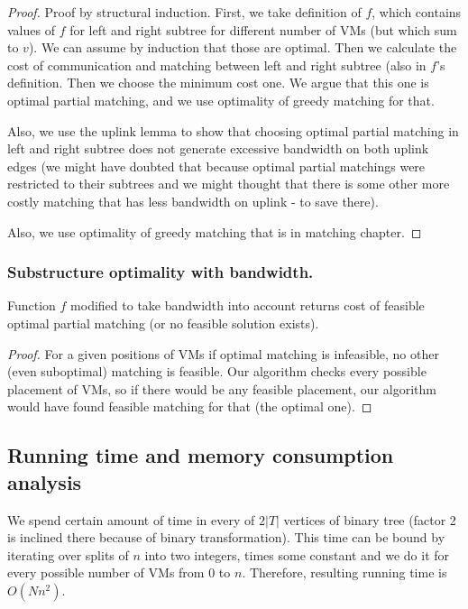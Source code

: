 \documentclass[9pt,twocolumn]{scrartcl}
\begin{document}
\begin{proof}
Proof by structural induction. First, we take definition of $f$, which
contains values of $f$ for left and right subtree for different number
of VMs (but which sum to $v$). We can assume by induction that those
are optimal. Then we calculate the cost of communication and matching
between left and right subtree (also in $f$'s definition. Then we
choose the minimum cost one. We argue that this one is optimal partial
matching, and we use optimality of greedy matching for that.

Also, we use the uplink lemma to show that choosing optimal partial
matching in left and right subtree does not generate excessive
bandwidth on both uplink edges (we might have doubted that because
optimal partial matchings were restricted to their subtrees and we
might thought that there is some other more costly matching that has
less bandwidth on uplink - to save there).

Also, we use optimality of greedy matching that is in matching
chapter.
\end{proof}

\subsubsection{Substructure optimality with bandwidth.}
\begin{lemma}
Function $f$ modified to take bandwidth into account returns cost of feasible optimal partial matching (or no feasible solution exists).
\end{lemma}

\begin{proof}

For a given positions of VMs if optimal matching is infeasible, no other (even suboptimal) matching is feasible. Our algorithm checks every possible placement of VMs, so if there would be any feasible placement, our algorithm would have found feasible matching for that (the optimal one).

\end{proof}
\subsection{Running time and memory consumption analysis}

We spend certain amount of time in every of $2|T|$ vertices of binary
tree (factor 2 is inclined there because of binary
transformation). This time can be bound by iterating over splits of
$n$ into two integers, times some constant and we do it for every
possible number of VMs from $0$ to $n$. Therefore, resulting running
time is $O(Nn^2)$.
\end{document}
